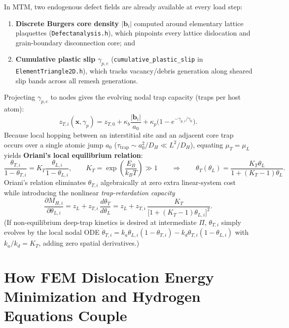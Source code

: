 \documentclass[11pt,a4paper]{article}
\newcommand{\code}[1]{\texttt{#1}}
\begin{document}
In MTM, two endogenous defect fields are already available at every load step:
\begin{enumerate}[nosep]
  \item \textbf{Discrete Burgers core density $|\mathbf{b}_i|$} computed around elementary lattice plaquettes (\code{Defectanalysis.h}), which pinpoints every lattice dislocation and grain-boundary disconnection core; and
  \item \textbf{Cumulative plastic slip $\gamma_{p,e}$} (\code{cumulative\_plastic\_slip} in \code{ElementTriangle2D.h}), which tracks vacancy/debris generation along sheared slip bands across all remesh generations.
\end{enumerate}
Projecting $\gamma_{p,e}$ to nodes gives the evolving nodal trap capacity (traps per host atom):
\begin{equation}
  z_{T,i}(\mathbf{x}, \gamma_p) = z_{T,0} + \kappa_b \frac{|\mathbf{b}_i|}{a_0} + \kappa_p \bigl(1 - e^{-\gamma_{p,i}/\gamma_0}\bigr).
  \label{eq:trap_density}
\end{equation}
Because local hopping between an interstitial site and an adjacent core trap occurs over a single atomic jump $a_0$ ($\tau_{\text{trap}} \sim a_0^2 / D_H \ll L^2 / D_H$), equating $\mu_T = \mu_L$ yields \textbf{Oriani's local equilibrium relation}:
\begin{equation}
  \frac{\theta_{T,i}}{1 - \theta_{T,i}} = K_T \frac{\theta_{L,i}}{1 - \theta_{L,i}}, \qquad
  K_T = \exp\!\left(\frac{E_B}{k_B T}\right) \gg 1
  \qquad\Longrightarrow\qquad
  \theta_{T}(\theta_L) = \frac{K_T \theta_L}{1 + (K_T - 1)\theta_L}.
  \label{eq:oriani}
\end{equation}
Oriani's relation eliminates $\theta_{T,i}$ algebraically at zero extra linear-system cost while introducing the nonlinear \emph{trap-retardation capacity}
\begin{equation}
  \frac{\partial M_{H,i}}{\partial \theta_{L,i}}
  = z_L + z_{T,i}\,\frac{d\theta_T}{d\theta_L}
  = z_L + z_{T,i}\,\frac{K_T}{\bigl[1 + (K_T - 1)\theta_{L,i}\bigr]^2}.
  \label{eq:ceff}
\end{equation}
(If non-equilibrium deep-trap kinetics is desired at intermediate $\Pi$, $\theta_{T,i}$ simply evolves by the local nodal ODE $\dot{\theta}_{T,i} = k_a \theta_{L,i}(1-\theta_{T,i}) - k_d \theta_{T,i}(1-\theta_{L,i})$ with $k_a / k_d = K_T$, adding zero spatial derivatives.)

\section{How FEM Dislocation Energy Minimization and Hydrogen Equations Couple}
\label{sec:coupling}
\end{document}
